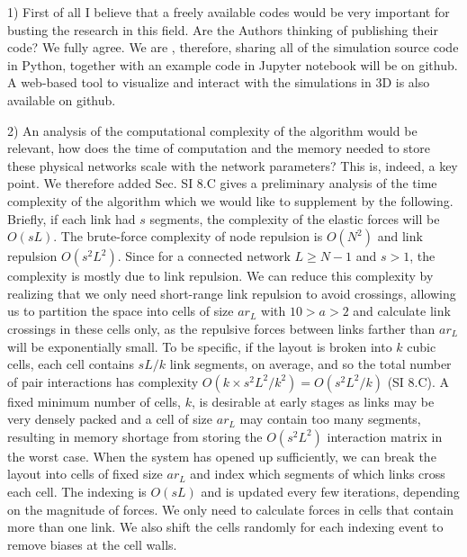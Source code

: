 \documentclass[11pt]{article}
\begin{document}
\begin{response}{
1) First of all I believe that a freely available codes would be very important for busting the research in this field. Are the Authors thinking of publishing their code?
}
We fully agree. We are , therefore, sharing 
all of the simulation source code in Python, together with an example code in Jupyter notebook will be on github. 
A web-based tool to visualize and interact with the simulations in 3D is also available on github. 
\end{response}
\begin{response}{
2) An analysis of the computational complexity of the algorithm would be relevant, how does the time of computation and the memory needed to store these physical networks scale with the network parameters?
}
This is, indeed, a key point. 
We therefore added Sec. SI 8.C gives a preliminary analysis of the time complexity of the algorithm which we would like to supplement by the following.  %
Briefly, if each link had $s$ segments, the  complexity of the elastic forces will be $O(sL)$.
The brute-force complexity of node repulsion is $O(N^2)$ and link repulsion $O(s^2L^2)$.
Since for a connected network $L\geq N-1$ and $s>1$, the complexity is mostly due to link repulsion. 
We can reduce this complexity by realizing that we only need short-range link repulsion to avoid crossings, allowing us to partition the space into cells of size $ar_L$ with $10>a>2$ and calculate link crossings in these cells only, as the repulsive forces between links farther than $ar_L$ will be exponentially small.
To be specific, if the layout is broken into $k$ cubic cells, each cell contains $sL/k$ link segments, on average, and so the total number of pair interactions has complexity
$O(k\times s^2L^2/k^2 ) = O(s^2L^2/k)$ (SI 8.C). 
A fixed minimum number of cells, $k$, is desirable at early stages as links may be very densely packed and a cell of size $ar_L$ may contain too many segments, resulting in memory shortage from storing the $O(s^2L^2)$ interaction matrix in the worst case. 
When the system has opened up sufficiently, we can break the layout into cells of fixed size $ar_L$ and index which segments of which links cross each cell. 
The indexing is $O(sL)$ and is updated every few iterations, depending on the magnitude of forces.
We only need to calculate forces in cells that contain more than one link.
We also shift the cells randomly for each indexing event to remove biases at the cell walls. 



\end{response}
\end{document}

